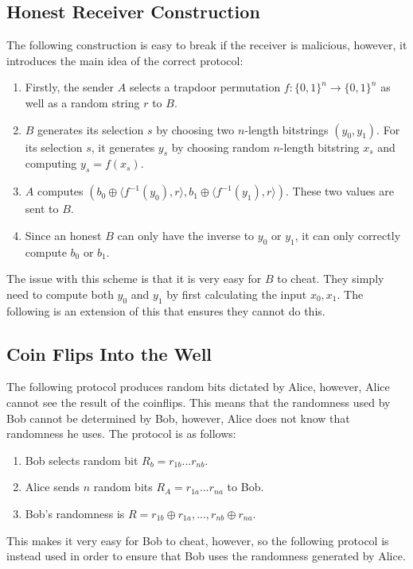 \documentclass[11pt]{article}
\begin{document}
\subsection{Honest Receiver Construction}
The following construction is easy to break if the receiver is malicious, however, it introduces the main idea of the correct protocol:
\begin{enumerate}
    \item Firstly, the sender $A$ selects a trapdoor permutation $f: \{0,1\}^n \rightarrow \{0,1\}^n$ as well as a random string $r$ to $B$.
    \item $B$ generates its selection $s$ by choosing two $n$-length bitstrings $(y_0,y_1)$. For its selection $s$, it generates $y_s$ by choosing random $n$-length bitstring $x_s$ and computing $y_s = f(x_s)$.
    \item $A$ computes $(b_0 \oplus \langle f^{-1}(y_0), r\rangle, b_1 \oplus \langle f^{-1}(y_1), r\rangle)$. These two values are sent to $B$.
    \item Since an honest $B$ can only have the inverse to $y_0$ or $y_1$, it can only correctly compute $b_0$ or $b_1$.
\end{enumerate}
The issue with this scheme is that it is very easy for $B$ to cheat. They simply need to compute both $y_0$ and $y_1$ by first calculating the input $x_0, x_1$. The following is an extension of this that ensures they cannot do this.
\subsection{Coin Flips Into the Well}
The following protocol produces random bits dictated by Alice, however, Alice cannot see the result of the coinflips. This means that the randomness used by Bob cannot be determined by Bob, however, Alice does not know that randomness he uses. The protocol is as follows:
\begin{enumerate}
    \item Bob selects random bit $R_b = r_{1b}...r_{nb}$.
    \item Alice sends $n$ random bits $R_A =r_{1a}...r_{na}$ to Bob.
    \item Bob's randomness is $R = r_{1b} \oplus r_{1a},..., r_{nb} \oplus r_{na}$.
\end{enumerate}
This makes it very easy for Bob to cheat, however, so the following protocol is instead used in order to ensure that Bob uses the randomness generated by Alice.
\end{document}

